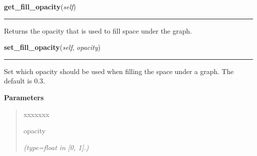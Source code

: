     \label{pygtk_chart:line_chart:Graph:get_fill_opacity}

    \vspace{0.5ex}

\hspace{.8\funcindent}\begin{boxedminipage}{\funcwidth}

    \raggedright \textbf{get\_fill\_opacity}(\textit{self})

    \vspace{-1.5ex}

    \rule{\textwidth}{0.5\fboxrule}
\setlength{\parskip}{2ex}
    Returns the opacity that is used to fill space under the graph.

\setlength{\parskip}{1ex}
    \end{boxedminipage}

    \label{pygtk_chart:line_chart:Graph:set_fill_opacity}

    \vspace{0.5ex}

\hspace{.8\funcindent}\begin{boxedminipage}{\funcwidth}

    \raggedright \textbf{set\_fill\_opacity}(\textit{self}, \textit{opacity})

    \vspace{-1.5ex}

    \rule{\textwidth}{0.5\fboxrule}
\setlength{\parskip}{2ex}
    Set which opacity should be used when filling the space under a graph. 
    The default is 0.3.

\setlength{\parskip}{1ex}
      \textbf{Parameters}
      \vspace{-1ex}

      \begin{quote}
        \begin{Ventry}{xxxxxxx}

          \item[opacity]

            {\it (type=float in [0, 1].)}

        \end{Ventry}

      \end{quote}

    \end{boxedminipage}

